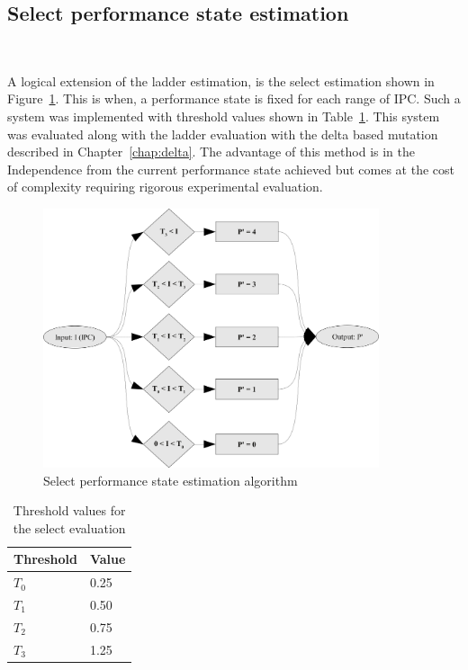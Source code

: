 \subsection{Select performance state estimation}~\label{sec:select}

A logical extension of the ladder estimation, is the select estimation shown in Figure~\ref{fig:select_method}.
This is when, a performance state is fixed for each range of IPC. Such a system was implemented with 
threshold values shown in Table~\ref{tab:sel_threshold}. This system was evaluated along with
the ladder evaluation with the delta based mutation described in Chapter~\ref{chap:delta}.
The advantage of this method is in the Independence from the current performance state
achieved but comes at the cost of complexity requiring rigorous experimental evaluation.

\begin{figure}[h!]
  \begin{center}
    \includegraphics[height=3in]{figures/Select_Evaluation.jpg}
    \caption{Select performance state estimation algorithm}
    \label{fig:select_method}
  \end{center}
\end{figure}

\begin{table}[h!]
 \begin{center}
\begin{tabular}{| l | l | }
\hline	
Threshold & Value \\
\hline
$T_0$ & 0.25  \\
$T_1$ & 0.50  \\
$T_2$ & 0.75  \\
$T_3$ & 1.25  \\
\hline  
\end{tabular}
 \end{center}
\caption{Threshold values for the select evaluation}
\label{tab:sel_threshold}
\end{table}



